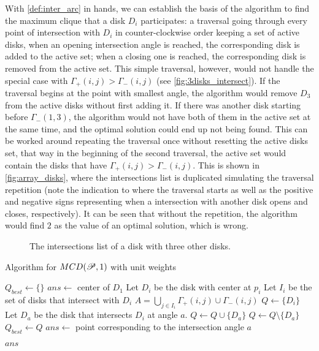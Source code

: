 With \autoref{def:inter_arc} in hands, we can establish the basis of the algorithm to find the maximum clique that a disk $D_i$ participates: a traversal going through every point of intersection with $D_i$ in counter-clockwise order keeping a set of active disks, when an opening intersection angle is reached, the corresponding disk is added to the active set; when a closing one is reached, the corresponding disk is removed from the active set.
This simple traversal, however, would not handle the special case with $\Gamma_+(i,j) > \Gamma_-(i,j)$ (see \autoref{fig:3disks_intersect}). If the traversal begins at the point with smallest angle, the algorithm would remove $D_3$ from the active disks without first adding it. If there was another disk starting before $\Gamma_-(1,3)$, the algorithm would not have both of them in the active set at the same time, and the optimal solution could end up not being found. This can be worked around repeating the traversal once without resetting the active disks set, that way in the beginning of the second traversal, the active set would contain the disks that have $\Gamma_+(i,j) > \Gamma_-(i,j)$. This is shown in \autoref{fig:array_disks}, where the intersections list is duplicated simulating the traversal repetition (note the indication to where the traversal starts as well as the positive and negative signs representing when a intersection with another disk opens and closes, respectively). It can be seen that without the repetition, the algorithm would find $2$ as the value of an optimal solution, which is wrong.

\begin{figure}[H]
    \centering
    
    \caption{The intersections list of a disk with three other disks.}
    
    \fautor
    \label{fig:array_disks}
\end{figure}

\begin{algoritmo}
\caption{Algorithm for $MCD(\mathscr{P}, 1)$ with unit weights}\label{algoritmo:mcd_1}
\begin{algorithmic}[1]
\State $Q_{best} \gets \{\}$
\State $ans \gets$ center of $D_1$
\State Let $D_i$ be the disk with center at $p_i$
\State Let $I_i$ be the set of disks that intersect with $D_i$
\State $A = \bigcup_{j \in I_i} \Gamma_+(i,j) \cup \Gamma_-(i,j)$
\State $Q \gets \{D_i\}$ 
 
\State Let $D_a$ be the disk that intersects $D_i$ at angle $a$. 
\State $Q \gets Q \cup \{D_a\}$
\Else
\State $Q \gets Q \setminus \{D_a\}$
\EndIf
{}
\State $Q_{best} \gets Q$
\State $ans \gets $ point corresponding to the intersection angle $a$
\EndIf
\EndFor
\EndFor
\EndFor

\State \Return $ans$
\EndProcedure
\end{algorithmic}
\end{algoritmo}

